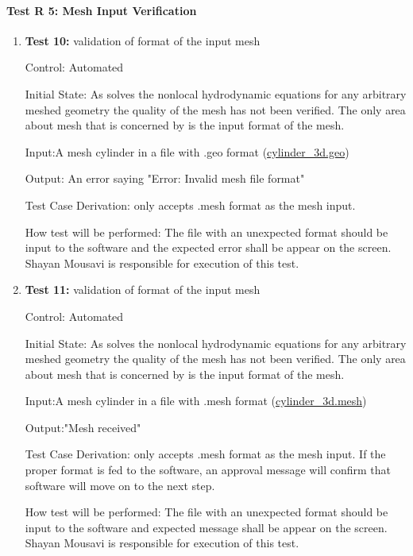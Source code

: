\documentclass[12pt, titlepage]{article}
\begin{document}
\paragraph{Test R 5: Mesh Input Verification}
\begin{enumerate}
\item{\textbf{Test 10:} validation of format of the input mesh\\}

Control: Automated

Initial State: As \progname{} solves the nonlocal hydrodynamic equations for any arbitrary meshed geometry the quality of the mesh has not been verified. The only area about mesh that is concerned by \progname{} is the input format of the mesh. 

Input:A mesh cylinder in a file with .geo format (\href{https://github.com/shmouses/SPDFM/blob/master/src/TestCase/cylinder\_3d.geo}{cylinder\_3d.geo}) 

Output: An error saying "Error: Invalid mesh file format" 

Test Case Derivation: \progname{} only accepts .mesh format as the mesh input. 

How test will be performed: The file with an unexpected format should be input to the software and the expected error shall be appear on the screen. Shayan Mousavi is responsible for execution of this test.  
\\
\item{\textbf{Test 11:} validation of format of the input mesh\\}

Control: Automated

Initial State: As \progname{} solves the nonlocal hydrodynamic equations for any arbitrary meshed geometry the quality of the mesh has not been verified. The only area about mesh that is concerned by \progname{} is the input format of the mesh. 

Input:A mesh cylinder in a file with .mesh format (\href{https://github.com/shmouses/SPDFM/blob/master/src/TestCase/cylinder\_3d.mesh}{cylinder\_3d.mesh}) 

Output:"Mesh received"

Test Case Derivation: \progname{} only accepts .mesh format as the mesh input. If the proper format is fed to the software, an approval message will confirm that software will move on to the next step.

How test will be performed: The file with an unexpected format should be input to the software and expected message shall be appear on the screen. Shayan Mousavi is responsible for execution of this test.  	
	
\end{enumerate}
\end{document}
